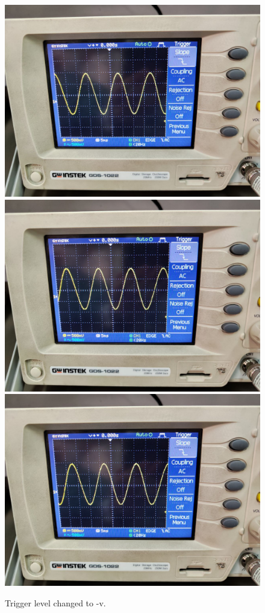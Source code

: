 \documentclass[11pt]{article}
\begin{document}
\begin{question}
{        \begin{figure}[H]
            \begin{center}
                \includegraphics[scale=0.1]{Fig/56.jpeg}
                \includegraphics[scale=0.1]{Fig/57.jpeg}
                \includegraphics[scale=0.1]{Fig/58.jpeg}
                \caption{Trigger level changed to -v.}
            \end{center}
        \end{figure}
        
}
\end{question}
\end{document}
